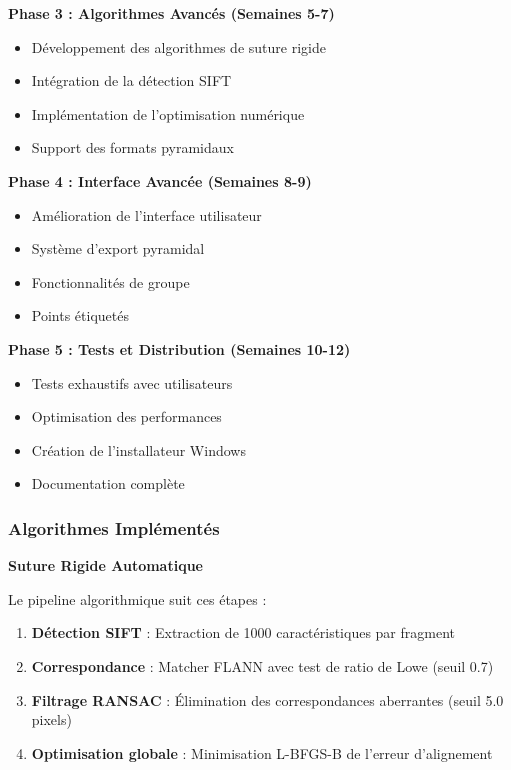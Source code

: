 \documentclass[12pt,a4paper]{article}
\begin{document}
\textbf{Phase 3 : Algorithmes Avancés (Semaines 5-7)}
\begin{itemize}
\item Développement des algorithmes de suture rigide
\item Intégration de la détection SIFT
\item Implémentation de l'optimisation numérique
\item Support des formats pyramidaux
\end{itemize}

\textbf{Phase 4 : Interface Avancée (Semaines 8-9)}
\begin{itemize}
\item Amélioration de l'interface utilisateur
\item Système d'export pyramidal
\item Fonctionnalités de groupe
\item Points étiquetés
\end{itemize}

\textbf{Phase 5 : Tests et Distribution (Semaines 10-12)}
\begin{itemize}
\item Tests exhaustifs avec utilisateurs
\item Optimisation des performances
\item Création de l'installateur Windows
\item Documentation complète
\end{itemize}

\subsubsection{Algorithmes Implémentés}

\textbf{Suture Rigide Automatique}

Le pipeline algorithmique suit ces étapes :

\begin{enumerate}
\item \textbf{Détection SIFT} : Extraction de 1000 caractéristiques par fragment
\item \textbf{Correspondance} : Matcher FLANN avec test de ratio de Lowe (seuil 0.7)
\item \textbf{Filtrage RANSAC} : Élimination des correspondances aberrantes (seuil 5.0 pixels)
\item \textbf{Optimisation globale} : Minimisation L-BFGS-B de l'erreur d'alignement
\end{enumerate}
\end{document}
